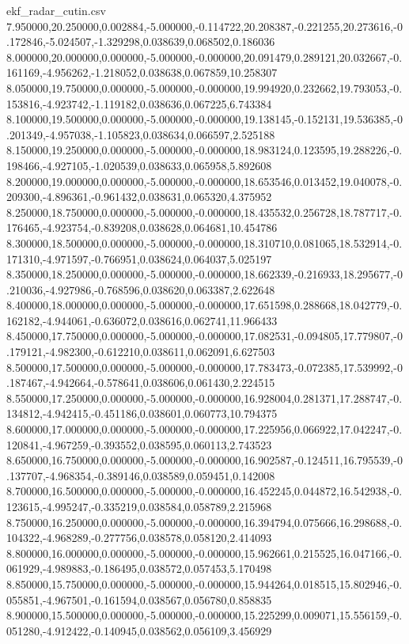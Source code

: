 \begin{filecontents*}[overwrite]{ekf_radar_cutin.csv}
7.950000,20.250000,0.002884,-5.000000,-0.114722,20.208387,-0.221255,20.273616,-0.172846,-5.024507,-1.329298,0.038639,0.068502,0.186036
8.000000,20.000000,0.000000,-5.000000,-0.000000,20.091479,0.289121,20.032667,-0.161169,-4.956262,-1.218052,0.038638,0.067859,10.258307
8.050000,19.750000,0.000000,-5.000000,-0.000000,19.994920,0.232662,19.793053,-0.153816,-4.923742,-1.119182,0.038636,0.067225,6.743384
8.100000,19.500000,0.000000,-5.000000,-0.000000,19.138145,-0.152131,19.536385,-0.201349,-4.957038,-1.105823,0.038634,0.066597,2.525188
8.150000,19.250000,0.000000,-5.000000,-0.000000,18.983124,0.123595,19.288226,-0.198466,-4.927105,-1.020539,0.038633,0.065958,5.892608
8.200000,19.000000,0.000000,-5.000000,-0.000000,18.653546,0.013452,19.040078,-0.209300,-4.896361,-0.961432,0.038631,0.065320,4.375952
8.250000,18.750000,0.000000,-5.000000,-0.000000,18.435532,0.256728,18.787717,-0.176465,-4.923754,-0.839208,0.038628,0.064681,10.454786
8.300000,18.500000,0.000000,-5.000000,-0.000000,18.310710,0.081065,18.532914,-0.171310,-4.971597,-0.766951,0.038624,0.064037,5.025197
8.350000,18.250000,0.000000,-5.000000,-0.000000,18.662339,-0.216933,18.295677,-0.210036,-4.927986,-0.768596,0.038620,0.063387,2.622648
8.400000,18.000000,0.000000,-5.000000,-0.000000,17.651598,0.288668,18.042779,-0.162182,-4.944061,-0.636072,0.038616,0.062741,11.966433
8.450000,17.750000,0.000000,-5.000000,-0.000000,17.082531,-0.094805,17.779807,-0.179121,-4.982300,-0.612210,0.038611,0.062091,6.627503
8.500000,17.500000,0.000000,-5.000000,-0.000000,17.783473,-0.072385,17.539992,-0.187467,-4.942664,-0.578641,0.038606,0.061430,2.224515
8.550000,17.250000,0.000000,-5.000000,-0.000000,16.928004,0.281371,17.288747,-0.134812,-4.942415,-0.451186,0.038601,0.060773,10.794375
8.600000,17.000000,0.000000,-5.000000,-0.000000,17.225956,0.066922,17.042247,-0.120841,-4.967259,-0.393552,0.038595,0.060113,2.743523
8.650000,16.750000,0.000000,-5.000000,-0.000000,16.902587,-0.124511,16.795539,-0.137707,-4.968354,-0.389146,0.038589,0.059451,0.142008
8.700000,16.500000,0.000000,-5.000000,-0.000000,16.452245,0.044872,16.542938,-0.123615,-4.995247,-0.335219,0.038584,0.058789,2.215968
8.750000,16.250000,0.000000,-5.000000,-0.000000,16.394794,0.075666,16.298688,-0.104322,-4.968289,-0.277756,0.038578,0.058120,2.414093
8.800000,16.000000,0.000000,-5.000000,-0.000000,15.962661,0.215525,16.047166,-0.061929,-4.989883,-0.186495,0.038572,0.057453,5.170498
8.850000,15.750000,0.000000,-5.000000,-0.000000,15.944264,0.018515,15.802946,-0.055851,-4.967501,-0.161594,0.038567,0.056780,0.858835
8.900000,15.500000,0.000000,-5.000000,-0.000000,15.225299,0.009071,15.556159,-0.051280,-4.912422,-0.140945,0.038562,0.056109,3.456929

\end{filecontents*}

